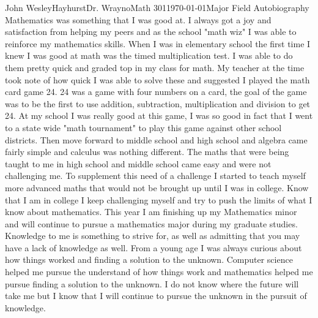 \documentclass{article}
\begin{document}
\begin{mla}{John Wesley}{Hayhurst}{Dr. Wrayno}{Math 301}{\today}{Major Field Autobiography}
Mathematics was something that I was good at. I always got a joy and satisfaction from helping my peers and as the school "math wiz" I was able to reinforce my mathematics skills. When I was in elementary school the first time I knew I was good at math was the timed multiplication test. I was able to do them pretty quick and graded top in my class for math. My teacher at the time took note of how quick I was able to solve these and suggested I played the math card game 24. 24 was a game with four numbers on a card, the goal of the game was to be the first to use addition, subtraction, multiplication and division to get 24. At my school I was really good at this game, I was so good in fact that I went to a state wide "math tournament" to play this game against other school districts. Then move forward to middle school and high school and algebra came fairly simple and calculus was nothing different. The maths that were being taught to me in high school and middle school came easy and were not challenging me. To supplement this need of a challenge I started to teach myself more advanced maths that would not be brought up until I was in college. Know that I am in college I keep challenging myself and try to push the limits of what I know about mathematics. This year I am finishing up my Mathematics minor and will continue to pursue a mathematics major during my graduate studies.\\

Knowledge to me is something to strive for, as well as admitting that you may have a lack of knowledge as well. From a young age I was always curious about how things worked and finding a solution to the unknown. Computer science helped me pursue the understand of how things work and mathematics helped me pursue finding a solution to the unknown. I do not know where the future will take me but I know that I will continue to pursue the unknown in the pursuit of knowledge.
\end {mla}
\end{document}
